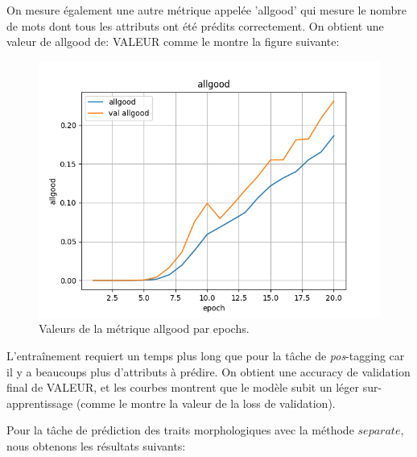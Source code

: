 \documentclass[a4paper]{article}
\begin{document}
On mesure également une autre métrique appelée 'allgood' qui mesure le nombre de mots dont tous les attributs 
ont été prédits correctement. On obtient une valeur de allgood de: VALEUR comme le
montre la figure suivante:

\begin{figure}[H]
    \centering
    \includegraphics[width=0.45\linewidth]{../logs/get_morphy_sep0_French_0/allgood.png}
    \caption{Valeurs de la métrique allgood par epochs.}
\end{figure}


L'entraînement requiert un temps plus long que pour la tâche de \textit{pos}-tagging car il y a beaucoups plus 
d'attributs à prédire.
On obtient une accuracy de validation final de VALEUR, et les courbes montrent que le modèle subit un 
léger sur-apprentissage (comme le montre la valeur de la loss de validation).

Pour la tâche de prédiction des traits morphologiques avec la méthode $separate$, nous obtenons les 
résultats suivants: %
\end{document}
